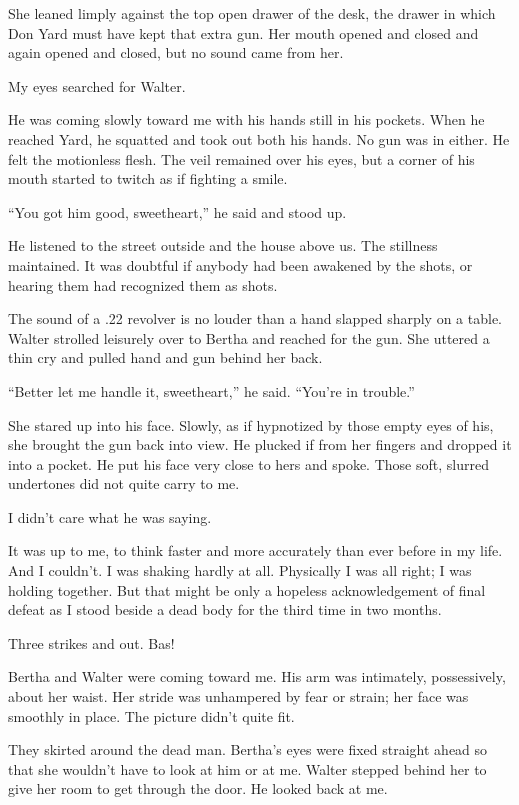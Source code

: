 \documentclass{novel}
\begin{document}
She leaned limply against the top open drawer of the desk, the drawer in which Don Yard must have kept that extra gun. Her mouth opened and closed and again opened and closed, but no sound came from her.

My eyes searched for Walter.

He was coming slowly toward me with his hands still in his pockets. When he reached Yard, he squatted and took out both his hands. No gun was in either. He felt the motionless flesh. The veil remained over his eyes, but a corner of his mouth started to twitch as if fighting a smile.

“You got him good, sweetheart,” he said and stood up.

He listened to the street outside and the house above us. The stillness maintained. It was doubtful if anybody had been awakened by the shots, or hearing them had recognized them as shots. 

The sound of a .22 revolver is no louder than a hand slapped sharply on a table. Walter strolled leisurely over to Bertha and reached for the gun. She uttered a thin cry and pulled hand and gun behind her back.

“Better let me handle it, sweetheart,” he said. “You’re in trouble.”

She stared up into his face. Slowly, as if hypnotized by those empty eyes of his, she brought the gun back into view. He plucked if from her fingers and dropped it into a pocket. He put his face very close to hers and spoke. Those soft, slurred undertones did not quite carry to me.

I didn’t care what he was saying. 

It was up to me, to think faster and more accurately than ever before in my life. And I couldn’t. I was shaking hardly at all. Physically I was all right; I was holding together. But that might be only a hopeless acknowledgement of final defeat as I stood beside a dead body for the third time in two months. 

Three strikes and out. Bas!

Bertha and Walter were coming toward me. His arm was intimately, possessively, about her waist. Her stride was unhampered by fear or strain; her face was smoothly in place. The picture didn’t quite fit.

They skirted around the dead man. Bertha’s eyes were fixed straight ahead so that she wouldn’t have to look at him or at me. Walter stepped behind her to give her room to get through the door. He looked back at me.
\end{document}

